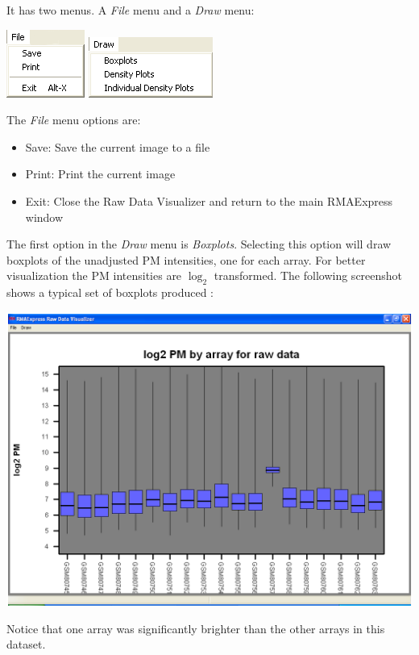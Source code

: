 \documentclass[11pt]{report}
\begin{document}
It has two menus. A {\it File} menu and a {\it Draw} menu:
\begin{center}
\includegraphics[scale=0.5]{rawdatavisualize2.png}\hspace{0.5in}
\includegraphics[scale=0.5]{rawdatavisualize3.png}
\end{center}
The {\it File} menu options are:
\begin{itemize}
\item{Save}: Save the current image to a file
\item{Print}: Print the current image
\item{Exit}: Close the Raw Data Visualizer and return to the main RMAExpress window
\end{itemize}



The first option in the {\it Draw} menu is {\it Boxplots}. Selecting this option will draw boxplots of the unadjusted PM intensities, one for each array. For better visualization the PM intensities are $\log_2$ transformed. The following screenshot shows a typical set of boxplots produced : 
\begin{center}
\includegraphics[scale=0.4]{rawdatavisualizeboxplot.png}
\end{center}
Notice that one array was significantly brighter than the other arrays in this dataset.
\end{document}
